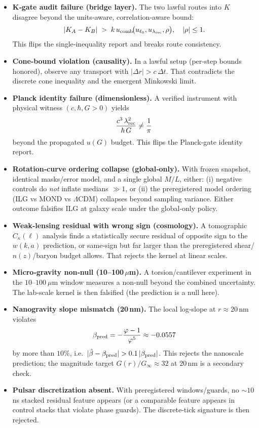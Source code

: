 \documentclass[11pt]{article}
\begin{document}
\begin{itemize}
  \item \textbf{K‑gate audit failure (bridge layer).} The two lawful routes into $K$ disagree beyond the units‑aware, correlation‑aware bound:
  \[
  |K_A-K_B| \;>\; k\,u_{\rm comb}\!\big(u_{\ell_0},u_{\lambda_{\rm rec}},\rho\big), \quad |\rho|\le 1.
  \]
  This flips the single‑inequality report and breaks route consistency.

  \item \textbf{Cone‑bound violation (causality).} In a lawful setup (per‑step bounds honored), observe any transport with $|\Delta r|>c\,\Delta t$. That contradicts the discrete cone inequality and the emergent Minkowski limit.

  \item \textbf{Planck identity failure (dimensionless).} A verified instrument with physical witness $(c,\hbar,G>0)$ yields
  \[
  \frac{c^3\,\lambda_{\rm rec}^2}{\hbar\,G} \ne \frac{1}{\pi}
  \]
  beyond the propagated $u(G)$ budget. This flips the Planck‑gate identity report.

  \item \textbf{Rotation‑curve ordering collapse (global‑only).} With frozen snapshot, identical masks/error model, and a single global $M/L$, either:
  (i) negative controls do \emph{not} inflate medians $\gg 1$, or
  (ii) the preregistered model ordering (ILG vs MOND vs $\Lambda$CDM) collapses beyond sampling variance.
  Either outcome falsifies ILG at galaxy scale under the global‑only policy.

  \item \textbf{Weak‑lensing residual with wrong sign (cosmology).} A tomographic $C_\kappa(\ell)$ analysis finds a statistically secure residual of opposite sign to the $w(k,a)$ prediction, or same‑sign but far larger than the preregistered shear/$n(z)$/baryon budget allows. That rejects the kernel at linear scales.

  \item \textbf{Micro‑gravity non‑null (10–100\,$\mu$m).} A torsion/cantilever experiment in the $10$–$100~\mu$m window measures a non‑null beyond the combined uncertainty. The lab‑scale kernel is then falsified (the prediction is a null here).

  \item \textbf{Nanogravity slope mismatch (20\,nm).} The local log‑slope at $r\!\approx\!20$\,nm violates
  \[
  \beta_{\rm pred}=-\frac{\varphi-1}{\varphi^5}\approx -0.0557
  \]
  by more than $10\%$, i.e.\ $|\hat\beta-\beta_{\rm pred}|>0.1\,|\beta_{\rm pred}|$. This rejects the nanoscale prediction; the magnitude target $G(r)/G_\infty\!\approx\!32$ at $20$\,nm is a secondary check.

  \item \textbf{Pulsar discretization absent.} With preregistered windows/guards, no $\sim10$\,ns stacked residual feature appears (or a comparable feature appears in control stacks that violate phase guards). The discrete‑tick signature is then rejected.
\end{itemize}
\end{document}
